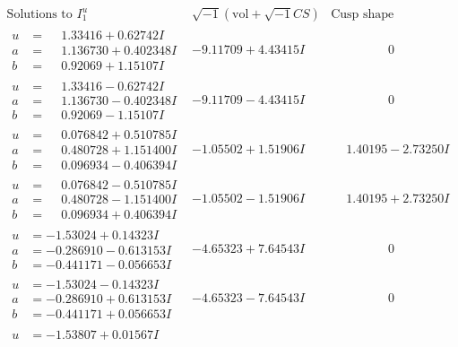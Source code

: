 \documentclass[1p]{elsarticle_modified}
\theoremstyle{definition}
\newcommand{\I}{\sqrt{-1}}
\begin{document}
$$\begin{array}{c|c|c}
\text{Solutions to }I^u_{1}& \I (\text{vol} + \sqrt{-1}CS) & \text{Cusp shape}\\
 \hline 
\begin{aligned}
u &= \phantom{-}1.33416 + 0.62742 I \\
a &= \phantom{-}1.136730 + 0.402348 I \\
b &= \phantom{-}0.92069 + 1.15107 I\end{aligned}
 & -9.11709 + 4.43415 I & \phantom{-0.000000 } 0 \\ \hline\begin{aligned}
u &= \phantom{-}1.33416 - 0.62742 I \\
a &= \phantom{-}1.136730 - 0.402348 I \\
b &= \phantom{-}0.92069 - 1.15107 I\end{aligned}
 & -9.11709 - 4.43415 I & \phantom{-0.000000 } 0 \\ \hline\begin{aligned}
u &= \phantom{-}0.076842 + 0.510785 I \\
a &= \phantom{-}0.480728 + 1.151400 I \\
b &= \phantom{-}0.096934 - 0.406394 I\end{aligned}
 & -1.05502 + 1.51906 I & \phantom{-}1.40195 - 2.73250 I \\ \hline\begin{aligned}
u &= \phantom{-}0.076842 - 0.510785 I \\
a &= \phantom{-}0.480728 - 1.151400 I \\
b &= \phantom{-}0.096934 + 0.406394 I\end{aligned}
 & -1.05502 - 1.51906 I & \phantom{-}1.40195 + 2.73250 I \\ \hline\begin{aligned}
u &= -1.53024 + 0.14323 I \\
a &= -0.286910 - 0.613153 I \\
b &= -0.441171 - 0.056653 I\end{aligned}
 & -4.65323 + 7.64543 I & \phantom{-0.000000 } 0 \\ \hline\begin{aligned}
u &= -1.53024 - 0.14323 I \\
a &= -0.286910 + 0.613153 I \\
b &= -0.441171 + 0.056653 I\end{aligned}
 & -4.65323 - 7.64543 I & \phantom{-0.000000 } 0 \\ \hline\begin{aligned}
u &= -1.53807 + 0.01567 I \\

\end{aligned}
\end{array}$$
\end{document}
